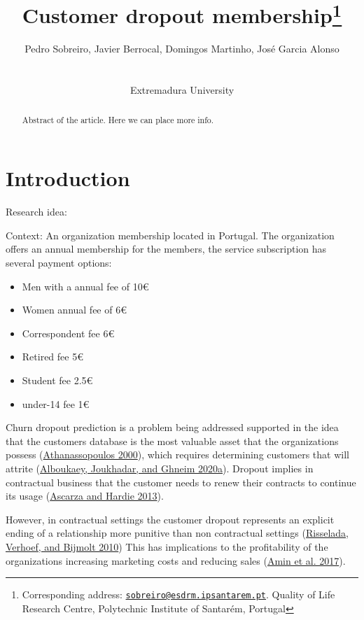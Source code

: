 \documentclass[
  12pt,
]{article}
\title{\hfill\break
\hfill\break
\hfill\break
\vspace{1cm}Customer dropout membership\footnote{Corresponding address: \href{mailto:sobreiro@esdrm.ipsantarem.pt}{\nolinkurl{sobreiro@esdrm.ipsantarem.pt}}. Quality of Life Research Centre, Polytechnic Institute of Santarém, Portugal}\vspace{0.5cm}}
\author{Pedro Sobreiro, Javier Berrocal, Domingos Martinho, José Garcia Alonso\\
\strut \\
Extremadura University\\}
\date{\hfill\break
\hfill\break
9 outubro, 2021\\
\strut \\}
\providecommand{\tightlist}{%
  \setlength{\itemsep}{0pt}\setlength{\parskip}{0pt}}
\begin{document}
\maketitle
\begin{abstract}
\noindent{}Abstract of the article. Here we can place more info.\vspace{.8cm}
\end{abstract}

\hypertarget{introduction}{%
\section{Introduction}\label{introduction}}

Research idea:

Context: An organization membership located in Portugal. The organization offers
an annual membership for the members, the service subscription has several
payment options:

\begin{itemize}
\tightlist
\item
  Men with a annual fee of 10€
\item
  Women annual fee of 6€
\item
  Correspondent fee 6€
\item
  Retired fee 5€
\item
  Student fee 2.5€
\item
  under-14 fee 1€
\end{itemize}

Churn dropout prediction is a problem being addressed supported in the idea that
the customers database is the most valuable asset that the organizations possess
(\protect\hyperlink{ref-Athanassopoulos_2000}{Athanassopoulos 2000}), which requires determining customers that will attrite
(\protect\hyperlink{ref-alboukaey_dynamic_2020}{Alboukaey, Joukhadar, and Ghneim 2020a}). Dropout implies in contractual business that the
customer needs to renew their contracts to continue its usage
(\protect\hyperlink{ref-Ascarza_Hardie_2013}{Ascarza and Hardie 2013}).

However, in contractual settings the customer dropout represents an explicit
ending of a relationship more punitive than non contractual settings
(\protect\hyperlink{ref-risselada_staying_2010}{Risselada, Verhoef, and Bijmolt 2010}) This has implications to the profitability of the
organizations increasing marketing costs and reducing sales
(\protect\hyperlink{ref-amin_customer_2017}{Amin et al. 2017}).
\end{document}
